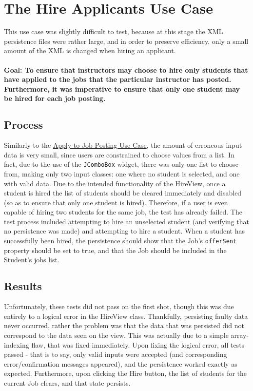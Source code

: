 \documentclass[12pt]{report}
\begin{document}
\section{The Hire Applicants Use Case}
This use case was slightly difficult to test, because at this stage the XML persistence files were
rather large, and in order to preserve efficiency, only a small amount of the XML is changed when
hiring an applicant.\\\\
\textbf{Goal: To ensure that instructors may choose to hire only students that have applied to the
jobs that the particular instructor has posted. Furthermore, it was imperative to ensure that only
one student may be hired for each job posting.}
\subsection*{Process}
Similarly to the \hyperref[s:nine]{Apply to Job Posting Use Case}, the amount of erroneous input
data is very small, since users are constrained to choose values from a list. In fact, due to the
use of the \texttt{JComboBox} widget, there was only one list to choose from, making only two input
classes: one where no student is selected, and one with valid data. Due to the intended
functionality of the HireView, once a student is hired the list of students should be cleared
immediately and disabled (so as to ensure that only one student is hired). Therefore, if a user is
even capable of hiring two students for the same job, the test has already failed. The test process
included attempting to hire an unselected student (and verifying that no persistence was made) and
attempting to hire a student. When a student has successfully been hired, the persistence should
show that the Job's \texttt{offerSent} property should be set to true, and that the Job should be
included in the Student's jobs list.
\subsection*{Results}
Unfortunately, these tests did not pass on the first shot, though this was due entirely to a logical
error in the HireView class. Thankfully, persisting faulty data never occurred, rather the problem
was that the data that was persisted did not correspond to the data seen on the view. This was
actually due to a simple array-indexing flaw, that was fixed immediately. Upon fixing the logical
error, all tests passed - that is to say, only valid inputs were accepted (and corresponding
error/confirmation messages appeared), and the persistence worked exactly as expected. Furthermore,
upon clicking the Hire button, the list of students for the current Job clears, and that state
persists.
\end{document}
